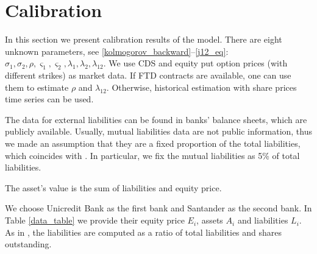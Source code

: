 \section{Calibration}

In this section we present calibration results of the model. There are eight unknown parameters, see \eqref{kolmogorov_backward}--\eqref{j12_eq}: $\sigma_1, \sigma_2, \rho, \varsigma_1, \varsigma_2, \lambda_1, \lambda_2, \lambda_{12}$. We use CDS and equity put option prices (with different strikes) as market data. If FTD contracts are available, one can use them to estimate $\rho$ and $\lambda_{12}$. Otherwise, historical estimation with share prices time series can be used. 

The data for external liabilities can be found in banks' balance sheets, which are publicly available. Usually, mutual liabilities data are not public information, thus we made an assumption that they are a fixed proportion of the total liabilities, which coincides with \cite{DavidLehar}. In particular, we fix the mutual liabilities as 5\% of total liabilities.

The asset's value is the sum of liabilities and equity price.

We choose Unicredit Bank as the first bank and Santander as the second bank. In Table \ref{data_table} we provide their equity price $E_i$, assets $A_i$ and liabilities $L_i$. As in \cite{LiptonSepp}, the liabilities are computed as a ratio of total liabilities and shares outstanding.

